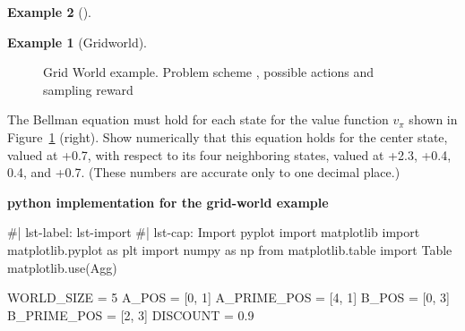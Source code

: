 \documentclass[
  letterpaper,
]{krantz}
\makeatletter
\newenvironment{Shaded}{\begin{snugshade}}{\end{snugshade}}
\newcommand{\CommentTok}[1]{\textcolor[rgb]{0.37,0.37,0.37}{#1}}
\newcommand{\DecValTok}[1]{\textcolor[rgb]{0.68,0.00,0.00}{#1}}
\newcommand{\FloatTok}[1]{\textcolor[rgb]{0.68,0.00,0.00}{#1}}
\newcommand{\ImportTok}[1]{\textcolor[rgb]{0.00,0.46,0.62}{#1}}
\newcommand{\NormalTok}[1]{\textcolor[rgb]{0.00,0.23,0.31}{#1}}
\newcommand{\OperatorTok}[1]{\textcolor[rgb]{0.37,0.37,0.37}{#1}}
\newcommand{\StringTok}[1]{\textcolor[rgb]{0.13,0.47,0.30}{#1}}
\newenvironment{kframe}{%
\medskip{}
\setlength{\fboxsep}{.8em}
 \def\at@end@of@kframe{}%
 \ifinner\ifhmode%
  \def\at@end@of@kframe{\end{minipage}}%
  \begin{minipage}{\columnwidth}%
 \fi\fi%
 \def\FrameCommand##1{\hskip\@totalleftmargin \hskip-\fboxsep
 \colorbox{shadecolor}{##1}\hskip-\fboxsep
     \hskip-\linewidth \hskip-\@totalleftmargin \hskip\columnwidth}%
 \MakeFramed {\advance\hsize-\width
   \@totalleftmargin\z@ \linewidth\hsize
   \@setminipage}}%
 {\par\unskip\endMakeFramed%
 \at@end@of@kframe}
\renewenvironment{Shaded}{\begin{kframe}}{\end{kframe}}
\theoremstyle{plain}
\theoremstyle{definition}
\newtheorem{example}{Example}[chapter]
\theoremstyle{definition}
\theoremstyle{remark}
\makeatother
\begin{document}
\begin{example}[]
\begin{example}[Gridworld]
\begin{figure}
{\begin{figure}[H]
\end{figure}%

}

\caption{\label{fig-grid-world-exm}Grid World example. Problem scheme ,
possible actions and sampling reward}

\end{figure}%

The Bellman equation must hold for each state for the value function
\(v_{\pi}\) shown in Figure~\ref{fig-grid-world-exm} (right). Show
numerically that this equation holds for the center state, valued at
+0.7, with respect to its four neighboring states, valued at +2.3, +0.4,
0.4, and +0.7. (These numbers are accurate only to one decimal place.)

\begin{tcolorbox}[enhanced jigsaw, bottomrule=.15mm, opacityback=0, breakable, colframe=quarto-callout-tip-color-frame, left=2mm, rightrule=.15mm, toprule=.15mm, leftrule=.75mm, arc=.35mm, colback=white]

\vspace{-3mm}\textbf{python implementation for the grid-world example}\vspace{3mm}

\begin{codelisting}[H]

\caption{\texttt{gridworld.py}}

\begin{Shaded}
\begin{Highlighting}[]
\CommentTok{\#| lst{-}label: lst{-}import}
\CommentTok{\#| lst{-}cap: Import pyplot}
\ImportTok{import}\NormalTok{ matplotlib}
\ImportTok{import}\NormalTok{ matplotlib.pyplot }\ImportTok{as}\NormalTok{ plt}
\ImportTok{import}\NormalTok{ numpy }\ImportTok{as}\NormalTok{ np}
\ImportTok{from}\NormalTok{ matplotlib.table }\ImportTok{import}\NormalTok{ Table}
\NormalTok{matplotlib.use(}\StringTok{\textquotesingle{}Agg\textquotesingle{}}\NormalTok{)}

\NormalTok{WORLD\_SIZE }\OperatorTok{=} \DecValTok{5}
\NormalTok{A\_POS }\OperatorTok{=}\NormalTok{ [}\DecValTok{0}\NormalTok{, }\DecValTok{1}\NormalTok{]}
\NormalTok{A\_PRIME\_POS }\OperatorTok{=}\NormalTok{ [}\DecValTok{4}\NormalTok{, }\DecValTok{1}\NormalTok{]}
\NormalTok{B\_POS }\OperatorTok{=}\NormalTok{ [}\DecValTok{0}\NormalTok{, }\DecValTok{3}\NormalTok{]}
\NormalTok{B\_PRIME\_POS }\OperatorTok{=}\NormalTok{ [}\DecValTok{2}\NormalTok{, }\DecValTok{3}\NormalTok{]}
\NormalTok{DISCOUNT }\OperatorTok{=} \FloatTok{0.9}


\end{Highlighting}
\end{Shaded}
\end{codelisting}
\end{tcolorbox}
\end{example}
\end{example}
\end{document}
